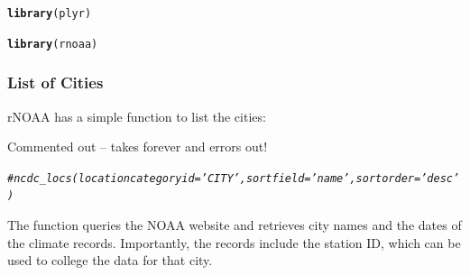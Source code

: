 \documentclass{article}\usepackage[]{graphicx}\usepackage[]{xcolor}
\makeatletter
\newcommand{\hlcom}[1]{\textcolor[rgb]{0.678,0.584,0.686}{\textit{#1}}}%
\newcommand{\hlstd}[1]{\textcolor[rgb]{0.345,0.345,0.345}{#1}}%
\newcommand{\hlkwd}[1]{\textcolor[rgb]{0.737,0.353,0.396}{\textbf{#1}}}%
\newenvironment{kframe}{%
 \def\at@end@of@kframe{}%
 \ifinner\ifhmode%
  \def\at@end@of@kframe{\end{minipage}}%
  \begin{minipage}{\columnwidth}%
 \fi\fi%
 \def\FrameCommand##1{\hskip\@totalleftmargin \hskip-\fboxsep
 \colorbox{shadecolor}{##1}\hskip-\fboxsep
     \hskip-\linewidth \hskip-\@totalleftmargin \hskip\columnwidth}%
 \MakeFramed {\advance\hsize-\width
   \@totalleftmargin\z@ \linewidth\hsize
   \@setminipage}}%
 {\par\unskip\endMakeFramed%
 \at@end@of@kframe}
\newenvironment{knitrout}{}{} %
\makeatother
\begin{document}
\begin{knitrout}
\color{fgcolor}\begin{kframe}
\begin{alltt}
\hlkwd{library}\hlstd{(plyr)}
\end{alltt}


{\ttfamily\noindent\color{warningcolor}{\#\# Warning: package 'plyr' was built under R version 4.2.2}}\begin{alltt}
\hlkwd{library}\hlstd{(rnoaa)}
\end{alltt}


{\ttfamily\noindent\itshape\color{messagecolor}{\#\# The rnoaa package will soon be retired and archived because the underlying APIs have changed dramatically. The package currently works but does not pull the most recent data in all cases. A noaaWeather package is planned as a replacement but the functions will not be interchangeable.}}\end{kframe}
\end{knitrout}



\subsubsection{List of Cities}

rNOAA has a simple function to list the cities:

Commented out -- takes forever and errors out!
\begin{knitrout}
\color{fgcolor}\begin{kframe}
\begin{alltt}
\hlcom{#ncdc_locs(locationcategoryid='CITY', sortfield='name', sortorder='desc')}
\end{alltt}
\end{kframe}
\end{knitrout}

The function queries the NOAA website and retrieves city names and the dates of the climate records. Importantly, the records include the station ID, which can be used to college the data for that city. 

\end{document}
